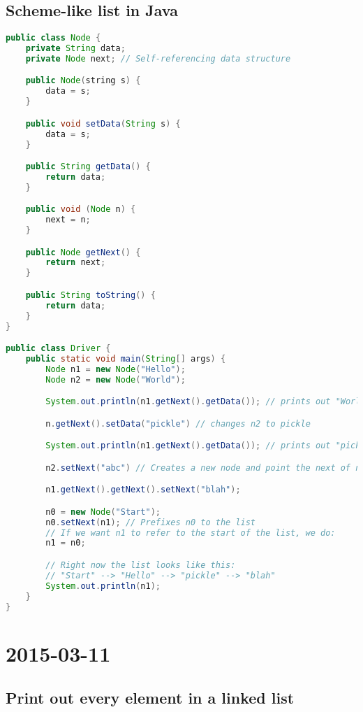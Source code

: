\documentclass [12 pt, twoside] {article}
\begin{document}
\subsection{Scheme-like list in Java}
\begin{lstlisting}[language=java]
public class Node {
    private String data;
    private Node next; // Self-referencing data structure

    public Node(string s) {
        data = s;
    }

    public void setData(String s) {
        data = s;
    }

    public String getData() {
        return data;
    }

    public void (Node n) {
        next = n;
    }

    public Node getNext() {
        return next;
    }

    public String toString() {
        return data;
    }
}

public class Driver {
    public static void main(String[] args) {
        Node n1 = new Node("Hello");
        Node n2 = new Node("World");

        System.out.println(n1.getNext().getData()); // prints out "World"

        n.getNext().setData("pickle") // changes n2 to pickle

        System.out.println(n1.getNext().getData()); // prints out "pickle"

        n2.setNext("abc") // Creates a new node and point the next of n2 to it.

        n1.getNext().getNext().setNext("blah");

        n0 = new Node("Start");
        n0.setNext(n1); // Prefixes n0 to the list
        // If we want n1 to refer to the start of the list, we do:
        n1 = n0;

        // Right now the list looks like this:
        // "Start" --> "Hello" --> "pickle" --> "blah"
        System.out.println(n1);
    }
}
\end{lstlisting}

\section{2015-03-11}

\subsection{Print out every element in a linked list}
\end{document}
